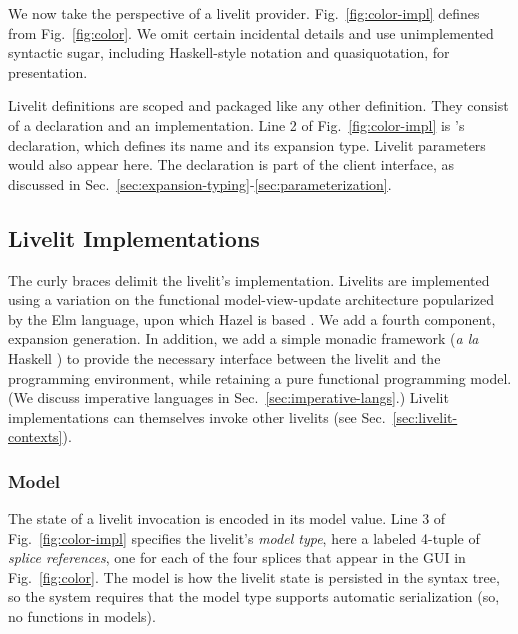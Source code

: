 \noindent
We now take the perspective of a livelit provider.
Fig.~\ref{fig:color-impl}
defines  from Fig.~\ref{fig:color}. We omit certain 
incidental details and use unimplemented syntactic sugar, including
Haskell-style  notation and quasiquotation, for presentation.

Livelit definitions are scoped and packaged like 
any other definition. They consist of a declaration and an implementation. 
Line 2 of Fig.~\ref{fig:color-impl} is 's declaration,
which defines its name and its {expansion type}. 
Livelit parameters would also appear here. 
The declaration is part of the client interface, 
as discussed in Sec.~\ref{sec:expansion-typing}-\ref{sec:parameterization}. 

\subsection{Livelit Implementations}
The curly braces delimit the livelit's implementation. 
Livelits are implemented using a variation on the functional model-view-update
architecture popularized by the Elm language, upon which Hazel is based \cite{ElmArchitecture}. We add a fourth component,
expansion generation. In addition, we add a simple monadic framework (\emph{a la} Haskell \cite{marlow2010haskell}) to provide the necessary  
interface between the livelit and the programming environment, while retaining
a pure functional programming model. (We discuss imperative languages in Sec.~\ref{sec:imperative-langs}.)
Livelit implementations can themselves invoke other livelits (see Sec.~\ref{sec:livelit-contexts}).

\subsubsection{Model}\label{sec:model}
The state of a livelit invocation is encoded in its model value. 
Line 3 of Fig.~\ref{fig:color-impl} specifies the livelit's \emph{model type},
here a labeled 4-tuple of \emph{splice references}, one for each of the four splices
that appear in the GUI in Fig.~\ref{fig:color}.
The model is how the livelit state is persisted in the syntax tree, so 
 the system requires that the model type supports automatic serialization
 (so, no functions in models).

